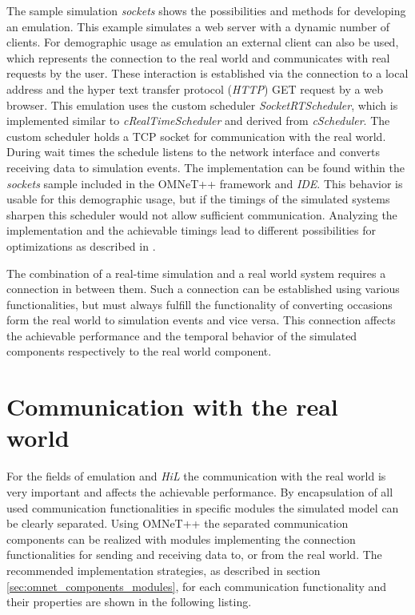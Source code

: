 The sample simulation \emph{sockets} shows the possibilities and methods for developing an emulation.
This example simulates a web server with a dynamic number of clients.
For demographic usage as emulation an external client can also be used, which represents the connection to the real world and communicates with real requests by the user.
These interaction is established via the connection to a local address and the hyper text transfer protocol (\emph{HTTP}) GET request by a web browser.
This emulation uses the custom scheduler \emph{SocketRTScheduler}, which is implemented similar to \emph{cRealTimeScheduler} and derived from \emph{cScheduler}. \cite{omnet_api}
The custom scheduler holds a TCP socket for communication with the real world.
During wait times the schedule listens to the network interface and converts receiving data to simulation events.
The implementation can be found within the \emph{sockets} sample included in the OMNeT++ framework and \emph{IDE}.
This behavior is usable for this demographic usage, but if the timings of the simulated systems sharpen this scheduler would not allow sufficient communication.
Analyzing the implementation and the achievable timings lead to different possibilities for optimizations as described in \cite{scussel_improvements_2015}.

The combination of a real-time simulation and a real world system requires a connection in between them.
Such a connection can be established using various functionalities, but must always fulfill the functionality of converting occasions form the real world to simulation events and vice versa.
This connection affects the achievable performance and the temporal behavior of the simulated components respectively to the real world component.

\section{Communication with the real world}
\label{sec:emulation_communication}
For the fields of emulation and \emph{HiL} the communication with the real world is very important and affects the achievable performance.
By encapsulation of all used communication functionalities in specific modules the simulated model can be clearly separated.
Using OMNeT++ the separated communication components can be realized with modules implementing the connection functionalities for sending and receiving data to, or from the real world.
The recommended implementation strategies, as described in section \ref{sec:omnet_components_modules}, for each communication functionality and their properties are shown in the following listing.

